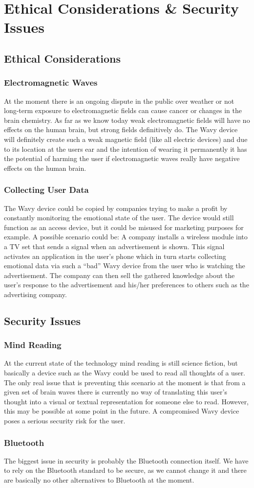 \section{Ethical Considerations \& Security Issues}
\label{sect:ethics-security}
\subsection{Ethical Considerations}

\subsubsection*{Electromagnetic Waves}
At the moment there is an ongoing dispute in the public over weather or not long-term exposure to electromagnetic fields can cause cancer or changes in the brain chemistry. As far as we know today weak electromagnetic fields will have no effects on the human brain, but strong fields definitively do. The Wavy device will definitely create such a weak magnetic field (like all electric devices) and due to its location at the users ear and the intention of wearing it permanently it has the potential of harming the user if electromagnetic waves really have negative effects on the human brain. 

\subsubsection*{Collecting User Data}
The Wavy device could be copied by companies trying to make a profit by constantly monitoring the emotional state of the user. The device would still function as an access device, but it could be misused for marketing purposes for example. A possible scenario could be: A company installs a wireless module into a TV set that sends a signal when an advertisement is shown. This signal activates an application in the user’s phone which in turn starts collecting emotional data via such a “bad” Wavy device from the user who is watching the advertisement. The company can then sell the gathered knowledge about the user’s response to the advertisement and his/her preferences to others such as the advertising company.

\subsection{Security Issues}
\subsubsection*{Mind Reading}
At the current state of the technology mind reading is still science fiction, but basically a device such as the Wavy could be used to read all thoughts of a user. The only real issue that is preventing this scenario at the moment is that from a given set of brain waves there is currently no way of translating this user’s thought into a visual or textual representation for someone else to read. However, this may be possible at some point in the future. A compromised Wavy device poses a serious security risk for the user.

\subsubsection*{Bluetooth}
The biggest issue in security is probably the Bluetooth connection itself. We have to rely on the Bluetooth standard to be secure, as we cannot change it and there are basically no other alternatives to Bluetooth at the moment.

